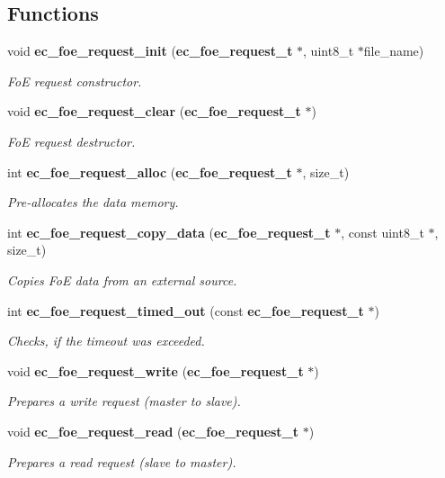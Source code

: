 \subsection*{\-Functions}
\begin{DoxyCompactItemize}
\item 
void {\bf ec\-\_\-foe\-\_\-request\-\_\-init} ({\bf ec\-\_\-foe\-\_\-request\-\_\-t} $\ast$, uint8\-\_\-t $\ast$file\-\_\-name)
\begin{DoxyCompactList}\small\item\em \-Fo\-E request constructor. \end{DoxyCompactList}\item 
void {\bf ec\-\_\-foe\-\_\-request\-\_\-clear} ({\bf ec\-\_\-foe\-\_\-request\-\_\-t} $\ast$)\label{foe__request_8h_a283c9080b0bde8595ed2d6833976013c}

\begin{DoxyCompactList}\small\item\em \-Fo\-E request destructor. \end{DoxyCompactList}\item 
int {\bf ec\-\_\-foe\-\_\-request\-\_\-alloc} ({\bf ec\-\_\-foe\-\_\-request\-\_\-t} $\ast$, size\-\_\-t)
\begin{DoxyCompactList}\small\item\em \-Pre-\/allocates the data memory. \end{DoxyCompactList}\item 
int {\bf ec\-\_\-foe\-\_\-request\-\_\-copy\-\_\-data} ({\bf ec\-\_\-foe\-\_\-request\-\_\-t} $\ast$, const uint8\-\_\-t $\ast$, size\-\_\-t)
\begin{DoxyCompactList}\small\item\em \-Copies \-Fo\-E data from an external source. \end{DoxyCompactList}\item 
int {\bf ec\-\_\-foe\-\_\-request\-\_\-timed\-\_\-out} (const {\bf ec\-\_\-foe\-\_\-request\-\_\-t} $\ast$)
\begin{DoxyCompactList}\small\item\em \-Checks, if the timeout was exceeded. \end{DoxyCompactList}\item 
void {\bf ec\-\_\-foe\-\_\-request\-\_\-write} ({\bf ec\-\_\-foe\-\_\-request\-\_\-t} $\ast$)\label{foe__request_8h_ad55e368490ade6fcb317302be6b4d684}

\begin{DoxyCompactList}\small\item\em \-Prepares a write request (master to slave). \end{DoxyCompactList}\item 
void {\bf ec\-\_\-foe\-\_\-request\-\_\-read} ({\bf ec\-\_\-foe\-\_\-request\-\_\-t} $\ast$)\label{foe__request_8h_a2ea1641840c50e93b9c1d22257677d9c}

\begin{DoxyCompactList}\small\item\em \-Prepares a read request (slave to master). \end{DoxyCompactList}\end{DoxyCompactItemize}


